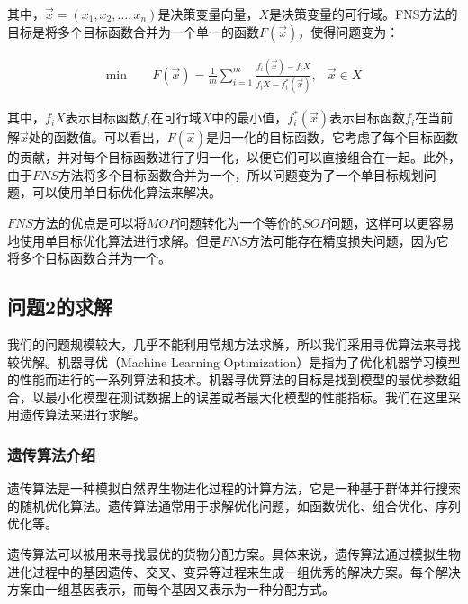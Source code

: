 \documentclass{MathorCupmodeling}
\begin{document}
其中，$\vec{x}=(x_1,x_2,\dots,x_n)$是决策变量向量，$X$是决策变量的可行域。FNS方法的目标是将多个目标函数合并为一个单一的函数$F(\vec{x})$，使得问题变为：

\begin{equation}
\begin{aligned}
\min \ \quad &F(\vec{x})=\frac{1}{m}\sum_{i=1}^{m} \frac{f_i(\vec{x})-f_iX}{f_iX-f_i^*(\vec{x})}, &\vec{x}\in X
\end{aligned}
\end{equation}

其中，$f_iX$表示目标函数$f_i$在可行域$X$中的最小值，$f_i^*(\vec{x})$表示目标函数$f_i$在当前解$\vec{x}$处的函数值。可以看出，$F(\vec{x})$是归一化的目标函数，它考虑了每个目标函数的贡献，并对每个目标函数进行了归一化，以便它们可以直接组合在一起。此外，由于$FNS$方法将多个目标函数合并为一个，所以问题变为了一个单目标规划问题，可以使用单目标优化算法来解决。

$FNS$方法的优点是可以将$MOP$问题转化为一个等价的$SOP$问题，这样可以更容易地使用单目标优化算法进行求解。但是$FNS$方法可能存在精度损失问题，因为它将多个目标函数合并为一个。

\subsection{问题2的求解}
我们的问题规模较大，几乎不能利用常规方法求解，所以我们采用寻优算法来寻找较优解。机器寻优（Machine Learning Optimization）是指为了优化机器学习模型的性能而进行的一系列算法和技术。机器寻优算法的目标是找到模型的最优参数组合，以最小化模型在测试数据上的误差或者最大化模型的性能指标。我们在这里采用遗传算法来进行求解。
\subsubsection{遗传算法介绍}
遗传算法是一种模拟自然界生物进化过程的计算方法，它是一种基于群体并行搜索的随机优化算法。遗传算法通常用于求解优化问题，如函数优化、组合优化、序列优化等。

遗传算法可以被用来寻找最优的货物分配方案。具体来说，遗传算法通过模拟生物进化过程中的基因遗传、交叉、变异等过程来生成一组优秀的解决方案。每个解决方案由一组基因表示，而每个基因又表示为一种分配方式。
\end{document}
